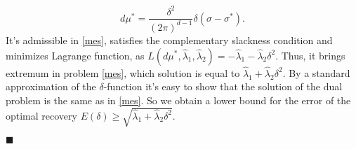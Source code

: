 \documentclass[12pt]{iopart}
\newenvironment{proof}
{\par\noindent{\bf Proof}}
{\hfill$\scriptstyle\blacksquare$}
\begin{document}
\begin{proof}
  \[
  d\mu^*=\frac{\delta^2}{(2\pi)^{d-1}}\delta\left(\sigma-\sigma^*\right).
\] 
It's admissible in \eqref{mes}, satisfies the complementary slackness condition and minimizes Lagrange function, as $L(d\mu^*,\widehat\lambda_1,\widehat\lambda_2)=-\widehat\lambda_1-\widehat\lambda_2\delta^2$. Thus, it brings extremum in problem \eqref{mes}, which solution is equal to $\widehat\lambda_1+\widehat\lambda_2\delta^2$.
By a standard approximation of the $\delta$-function it's easy to show that the solution of the dual problem is the same as in \eqref{mes}. So we obtain a lower bound for the error of the optimal recovery $E(\delta)\ge\sqrt{\widehat\lambda_1+\widehat\lambda_2\delta^2}$.


\end{proof}
\end{document}
